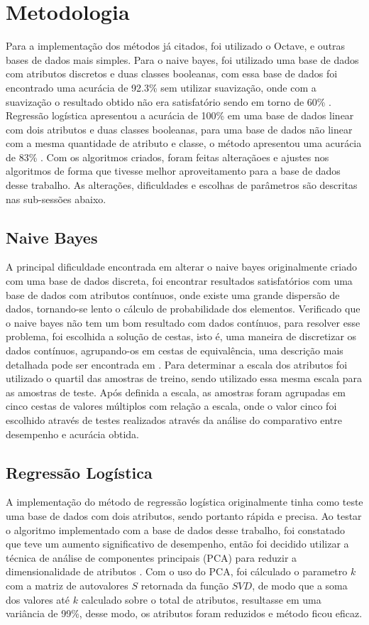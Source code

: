 \documentclass[10pt, conference, compsocconf]{IEEEtran}
\begin{document}
\section{Metodologia}\label{metodologia}
Para a implementação dos métodos já citados, foi utilizado o Octave, e outras bases de dados mais simples. Para o naive bayes, foi utilizado uma base de dados com atributos discretos e duas classes booleanas, com essa base de dados foi encontrado uma acurácia de 92.3\% sem utilizar suavização, onde com a suavização o resultado obtido não era satisfatório sendo em torno de 60\% . 
Regressão logística apresentou a acurácia de 100\%  em uma base de dados linear com dois atributos e duas classes booleanas, para uma base de dados não linear com a mesma quantidade de atributo e classe, o método apresentou uma acurácia de 83\% .
Com os algoritmos criados, foram feitas alteraçãoes e ajustes nos algoritmos de forma que tivesse melhor aproveitamento para a base de dados desse trabalho. As alterações, dificuldades e escolhas de parâmetros são descritas nas sub-sessões abaixo.
\subsection{Naive Bayes}
A principal dificuldade encontrada em alterar o naive bayes originalmente criado com uma base de dados discreta, foi encontrar resultados satisfatórios com uma base de dados com atributos contínuos, onde existe uma grande dispersão de dados, tornando-se lento o cálculo de probabilidade dos elementos. Verificado que o naive bayes não tem um bom resultado com dados contínuos, para resolver esse problema, foi escolhida a solução de cestas, isto é, uma maneira de discretizar os dados contínuos, agrupando-os em cestas de equivalência, uma descrição mais detalhada pode ser encontrada em \cite{8}. 
Para determinar a escala dos atributos foi utilizado o quartil das amostras de treino, sendo utilizado essa mesma escala para as amostras de teste. Após definida a escala, as amostras foram agrupadas em cinco cestas de valores múltiplos com relação a escala, onde o valor cinco foi escolhido através de testes realizados através da análise do comparativo entre desempenho e acurácia obtida.
\subsection{Regressão Logística}
A implementação do método de regressão logística originalmente tinha como teste uma base de dados com dois atributos, sendo portanto rápida e precisa. Ao testar o algoritmo implementado com a base de dados desse trabalho, foi constatado que teve um aumento significativo de desempenho, então foi decidido utilizar a técnica de análise de componentes principais (PCA) para reduzir a dimensionalidade de atributos \cite{9}. 
Com o uso do PCA, foi cálculado o parametro $k$ com a matriz de autovalores $S$ retornada da função $SVD$, de modo que a soma dos valores até $k$ calculado sobre o total de atributos, resultasse em uma variância de 99\%, desse modo, os atributos foram reduzidos e método ficou eficaz. 
\end{document}
